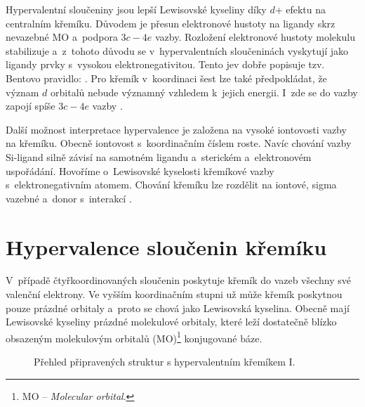 \documentclass[
digital, %
table,   %
nolof,     %
nolot,     %
oneside,
]{fithesis3}
\renewcommand{\thesubfigure}{}
\begin{document}
Hypervalentní sloučeniny jsou lepší Lewisovské kyseliny díky $d$+ efektu na centralním křemíku. Důvodem je přesun elektronové hustoty na ligandy skrz nevazebné MO a~podpora $3c-4e$ vazby. Rozložení elektronové hustoty molekulu stabilizuje a~z~tohoto důvodu se v~hypervalentních sloučeninách vyskytují jako ligandy prvky s~vysokou elektronegativitou. Tento jev dobře popisuje tzv. Bentovo pravidlo: \cite{hypervalentsiliconmacmillangroup2005}. Pro křemík v~koordinaci šest lze také předpokládat, že význam $d$ orbitalů nebude významný vzhledem k~jejich energii. I~zde se do vazby zapojí spíše $3c-4e$ vazby \cite{Wagler2014}.

Další možnost interpretace hypervalence je založena na vysoké iontovosti vazby na křemíku. Obecně iontovost s~koordinačním číslem roste.
Navíc chování vazby Si-ligand silně závisí na samotném ligandu a~sterickém a~elektronovém uspořádání. Hovoříme o~Lewisovské kyselosti křemíkové vazby s~elektronegativním atomem. Chování křemíku lze rozdělit na iontové, sigma vazebné a~donor s~interakcí \cite{Wagler2014}.\\

\section{Hypervalence sloučenin křemíku}\label{teorie_hypervalence}
V~případě čtyřkoordinovaných sloučenin poskytuje křemík do vazeb všechny své valenční elektrony. Ve vyšším koordinačním stupni už může křemík poskytnou pouze prázdné orbitaly a~proto se chová jako Lewisovská kyselina. Obecně mají Lewisovské kyseliny prázdné molekulové orbitaly, které leží dostatečně blízko obsazeným molekulovým orbitalů (MO)\footnote{MO -- \textit{Molecular orbital}.} konjugované báze.
\renewcommand{\thesubfigure}{(\alph{subfigure})}
\begin{figure}
\begin{center}
\label{shrnuti_struktury_kremikI}
\caption{Přehled připravených struktur s hypervalentním křemíkem I.}
\end{center}
\end{figure}
\end{document}
